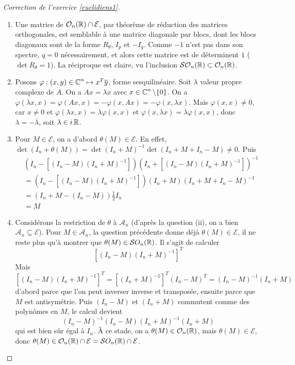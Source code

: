 \begin{proof}[Correction de l'exercice \ref{euclidiens1}]
	\begin{enumerate}
		\item Une matrice de $\mathcal O_n(\operatorname{\mathbb R})\cap \mathcal E$, par théorème de réduction des matrices orthogonales,
		est semblable à une matrice diagonale par blocs, dont les blocs diagonaux sont de la forme $R_\theta$, $I_p$ et $-I_q$.
		Comme $-1$ n'est pas dans son spectre, $q=0$ nécessairement, et alors cette matrice est de déterminent $1$ ($\det R_\theta = 1$).
		La réciproque est claire, vu l'inclusion $\mathcal{SO}_n(\operatorname{\mathbb R})\subset \mathcal{O}_n(\operatorname{\mathbb R})$.

		\item Posons $\varphi:(x,y)\in\operatorname{\mathbb C}^n\mapsto x^T\overline y$, forme sesquilinéaire. 
		Soit $\lambda$ valeur propre complexe de $A$. 
		On a $Ax=\lambda x$ avec $x\in \operatorname{\mathbb C}^n\backslash\lbrace 0\rbrace$. 
		On a $\varphi(\lambda x,x)=\varphi(Ax,x)=-\varphi(x,Ax)=-\varphi(x,\lambda x)$.
		Mais $\varphi(x,x)\neq 0$, car $x\neq 0$ et $\varphi(\lambda x,x)=\lambda\varphi(x,x)$ et $\varphi(x,\lambda x)=\overline\lambda\varphi(x,x)$,
		donc $\lambda=-\overline\lambda$, soit $\lambda\in i\operatorname{\mathbb R}$.

		\item Pour $M\in\mathcal E$, on a d'abord $\theta(M)\in\mathcal E$. 
		En effet, $\det(I_n+\theta(M))=\det(I_n+M)^{-1}\det(I_n+M+I_n-M)\neq 0$.
		Puis
		\begin{align*}
			&	(I_n-[(I_n-M)(I_n+M)^{-1}])(I_n+[(I_n-M)(I_n+M)^{-1}])^{-1}\\
			& = (I_n-[(I_n-M)(I_n+M)^{-1}])(I_n+M)(I_n+M+I_n-M)^{-1}\\
			& = (I_n+M-(I_n-M))\frac12 I_n\\
			& = M
		\end{align*}

		\item Considérons la restriction de $\theta$ à $\mathcal A_n$ (d'après la question (ii), on a bien $\mathcal A_n\subseteq \mathcal E$).
		Pour $M\in\mathcal A_n$, la question précédente donne déjà $\theta(M)\in \mathcal E$, il ne reste plus qu'à montrer que $\theta(M)\in\mathcal SO_n(\operatorname{\mathbb R})$.
		Il s'agit de calculer 
		\[
			[(I_n-M)(I_n+M)^{-1}]^T
		\] 
		Mais $[(I_n-M)(I_n+M)^{-1}]^T=[(I_n+M)^{-1}]^T(I_n-M)^T=(I_n-M)^{-1}(I_n+M)$ 
		d'abord parce que l'on peut inverser inverse et transposée, ensuite parce que $M$ 
		est antisymétrie. Puis $(I_n-M)$ et $(I_n+M)$ commutent comme des polynômes en $M$, le calcul devient 
		\[
			(I_n-M)^{-1}(I_n-M)(I_n+M)^{-1}(I_n+M)
		\]
		qui est bien sûr égal à $I_n$. 
		À ce stade, on a $\theta(M)\in\mathcal O_n(\operatorname{\mathbb R})$, mais $\theta(M)\in\mathcal E$, donc $\theta(M)\in\mathcal O_n(\operatorname{\mathbb R})\cap\mathcal E=\mathcal SO_n(\operatorname{\mathbb R})\cap\mathcal E$.


	\end{enumerate}
\end{proof}


